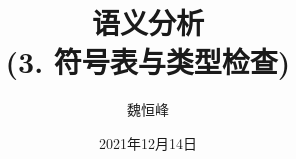 \documentclass[]{beamer}
\title[语义分析]{语义分析 \\(3. 符号表与类型检查)}
\author[魏恒峰]{\large 魏恒峰}
\institute{hfwei@nju.edu.cn}
\date{2021年12月14日}
\begin{document}
\maketitle




\thankyou{}

\end{document}
